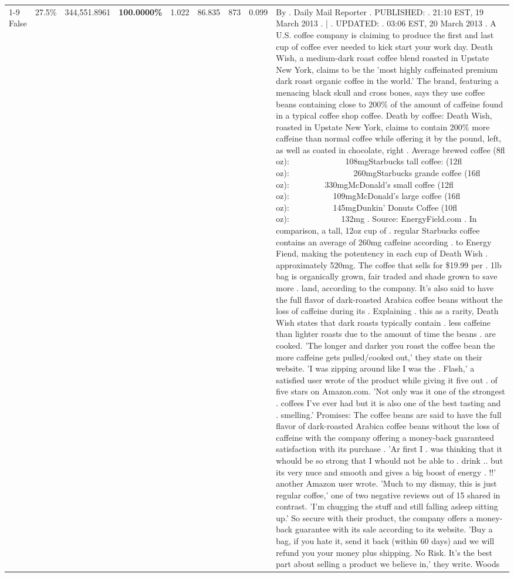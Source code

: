 \begin{table}[H]
{\begin{tabular}{lllrlllll}
\cline{1-9} \cline{2-9}
False & 27.5\% & 344,551.8961 & \bfseries \color{red} 100.0000\% & 1.022 & 86.835 & 873 & 0.099 & By . Daily Mail Reporter . PUBLISHED: . 21:10 EST, 19 March 2013 . | . UPDATED: . 03:06 EST, 20 March 2013 . A U.S. coffee company is claiming to produce the first and last cup of coffee ever needed to kick start your work day. Death Wish, a medium-dark roast coffee blend roasted in Upstate New York, claims to be the 'most highly caffeinated premium dark roast organic coffee in the world.' The brand, featuring a menacing black skull and cross bones, says they use coffee beans containing close to 200\% of the amount of caffeine found in a typical coffee shop coffee. Death by coffee: Death Wish, roasted in Upstate New York, claims to contain 200\% more caffeine than normal coffee while offering it by the pound, left, as well as coated in chocolate, right . Average brewed coffee (8fl oz):              108mgStarbucks tall coffee: (12fl oz):                260mgStarbucks grande coffee (16fl oz):         330mgMcDonald's small coffee (12fl oz):           109mgMcDonald's large coffee (16fl oz):           145mgDunkin' Donuts Coffee (10fl oz):             132mg . Source: EnergyField.com . In comparison, a tall, 12oz cup of . regular Starbucks coffee contains an average of 260mg caffeine according . to Energy Fiend, making the potentency in each cup of Death Wish . approximately 520mg. The coffee that sells for \$19.99 per . 1lb bag is organically grown, fair traded and shade grown to save more . land, according to the company. It's also said to have the full flavor of dark-roasted Arabica coffee beans without the loss of caffeine during its . Explaining . this as a rarity, Death Wish states that dark roasts typically contain . less caffeine than lighter roasts due to the amount of time the beans . are cooked. 'The longer and darker you roast the coffee bean the more caffeine gets pulled/cooked out,' they state on their website. 'I was zipping around like I was the . Flash,' a satisfied user wrote of the product while giving it five out . of five stars on Amazon.com. 'Not only was it one of the strongest . coffees I've ever had but it is also one of the best tasting and . smelling.’ Promises: The coffee beans are said to have the full flavor of dark-roasted Arabica coffee beans without the loss of caffeine with the company offering a money-back guaranteed satisfaction with its purchase . 'Ar first I . was thinking that it whould be so strong that I whould not be able to . drink .. but its very nuce and smooth and gives a big boost of energy . !!' another Amazon user wrote. 'Much to my dismay, this is just regular coffee,' one of two negative reviews out of 15 shared in contrast. 'I'm chugging the stuff and still falling asleep sitting up.' So secure with their product, the company offers a money-back guarantee with its sale according to its website. 'Buy a bag, if you hate it, send it back (within 60 days) and we will refund you your money plus shipping. No Risk. It’s the best part about selling a product we believe in,' they write. Woods \\

\end{tabular}}
\end{table}
